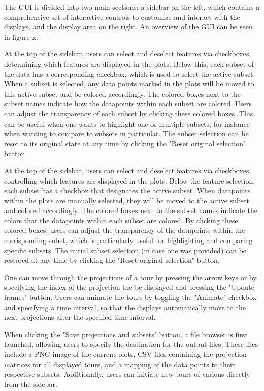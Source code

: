 \documentclass[article]{ajs}
\begin{document}
The GUI is divided into two main sections: a sidebar on the left, which contains a comprehensive set of interactive controls to customize and interact with the displays, and the display area on the right. An overview of the GUI can be seen in figure x.

At the top of the sidebar, users can select and deselect features via checkboxes, determining which features are displayed in the plots. Below this, each subset of the data has a corresponding checkbox, which is used to select the active subset. When a subset is selected, any data points marked in the plots will be moved to this active subset and be colored accordingly. The colored boxes next to the subset names indicate how the datapoints within each subset are colored. Users can adjust the transparency of each subset by clicking these colored boxes. This can be useful when one wants to highlight one or multiple subsets, for instance when wanting to compare to subsets in particular. The subset selection can be reset to its original state at any time by clicking the "Reset original selection" button.

At the top of the sidebar, users can select and deselect features via checkboxes, controlling which features are displayed in the plots. Below the feature selection, each subset has a checkbox that designates the active subset. When datapoints within the plots are manually selected, they will be moved to the active subset and colored accordingly. The colored boxes next to the subset names indicate the colors that the datapoints within each subset are colored. By clicking these colored boxes, users can adjust the transparency of the datapoints within the corrisponding subet, which is particularly useful for highlighting and comparing specific subsets. The initial subset selection (in case one was provided) can be restored at any time by clicking the "Reset original selection" button.

One can move through the projections of a tour by pressing the arrow keys or by specifying the index of the projection the be displayed and pressing the "Update frames" button. Users can animate the tours by toggling the "Animate" checkbox and specifying a time interval, so that the displays automatically move to the next projections after the specified time interval.

When clicking the "Save projections and subsets" button, a file browser is first launched, allowing users to specify the destination for the output files. These files include a PNG image of the current plots, CSV files containing the projection matrices for all displayed tours, and a mapping of the data points to their respective subsets. Additionally, users can initiate new tours of various directly from the sidebar.
\end{document}
